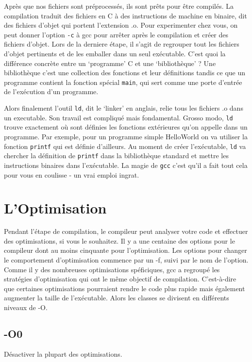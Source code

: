 \documentclass[11pt]{article} %
\begin{document}
Après que nos fichiers sont préprocessés, ils sont prêts pour être compilés. La compilation traduit des fichiers en C à des instructions de machine
en binaire, dit des fichiers d'objet qui portent l'extension .o. Pour experimenter chez vous, on peut donner l'option \verb|-c| à gcc pour arrêter après
le compilation et créer des fichiers d'objet.
    Lors de la derniere étape, il s'agit de regrouper tout les fichiers d'objet pertinents et de les emballer dans un seul exécutable. C'est quoi la différence concrète entre
un `programme' C et une `bibliothèque' ? Une bibliothèque c'est une collection des fonctions et leur définitions tandis ce que un programme contient la fonction spécial
\verb|main|, qui sert comme une porte d'entrée de l'exécution d'un programme.

    Alors finalement l'outil \verb|ld|, dit le `linker' en anglais, relie tous les fichiers .o dans un executable. Son travail est compliqué mais fondamental. Grosso modo, \verb|ld|
trouve exactement où sont définies les fonctions extérieures qu'on appelle dans un programme. Par exemple, pour un programme simple HelloWorld on va utiliser la fonction \verb|printf| qui
est définie d'ailleurs. Au moment de créer l'exécutable, \verb|ld| va chercher la définition de \verb|printf| dans la bibliothèque standard et mettre les instructions binaires dans l'exécutable.
La magie de \verb|gcc| c'est qu'il a fait tout cela pour vous en coulisse - un vrai emploi ingrat.
\section*{L'Optimisation}
Pendant l'étape de compilation, le compileur peut analyser votre code et effectuer des optimisations, si vous le souhaitez.
Il y a une centaine des options pour le compileur dont au moins cinquante pour l'optimisation. Les options pour changer le comportement
d'optimisation commence par un -f, suivi par le nom de l'option. Comme il y des nombreuses optimisations spéficiques, gcc a regroupé les
stratégies d'optimisation qui ont le même objectif de compilation. C'est-à-dire que certaines optimisations pourraient rendre le code plus rapide mais
également augmenter la taille de l'exécutable. Alors les classes se divisent en différents niveaux de -O.
\subsection*{-O0}
Désactiver la plupart des optimisations.
\end{document}
